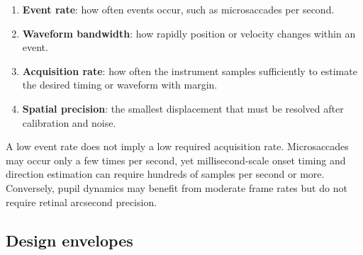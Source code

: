 \documentclass[11pt]{article}
\begin{document}
\begin{enumerate}
  \item \textbf{Event rate}: how often events occur, such as microsaccades per second.
  \item \textbf{Waveform bandwidth}: how rapidly position or velocity changes within an event.
  \item \textbf{Acquisition rate}: how often the instrument samples sufficiently to estimate the
  desired timing or waveform with margin.
  \item \textbf{Spatial precision}: the smallest displacement that must be resolved after
  calibration and noise.
\end{enumerate}

A low event rate does not imply a low required acquisition rate. Microsaccades may occur only a few
times per second, yet millisecond-scale onset timing and direction estimation can require hundreds
of samples per second or more. Conversely, pupil dynamics may benefit from moderate frame rates but
do not require retinal arcsecond precision.

\subsection{Design envelopes}
\end{document}
